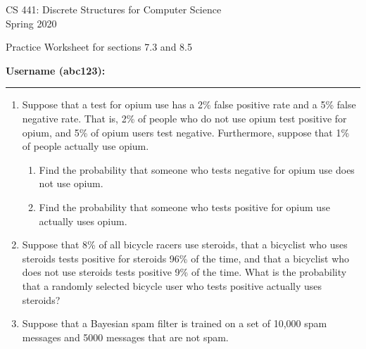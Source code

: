 \documentclass[12pt]{article}
\begin{document}
\begin{center}
CS 441: Discrete Structures for Computer Science \\
{\smaller[1] Spring 2020} \\

\vspace {0.25in}

Practice Worksheet for sections 7.3 and 8.5
\end{center}

\vspace{0.25in}

{\smaller[1]
\textbf{Username (abc123):} \rule{1.25in}{0.4pt}
}

\begin{enumerate} %


\item Suppose that a test for opium use has a 2\% false positive rate and a 5\%
false negative rate. That is, 2\% of people who do not use opium test positive
for opium, and 5\% of opium users test negative. Furthermore, suppose that 1\%
of people actually use opium.
%
\begin{enumerate}[itemsep=\fill,after=\vfill]

\item Find the probability that someone who tests negative for opium use does
not use opium.

\item Find the probability that someone who tests positive for opium use actually uses opium.

\end{enumerate}

\newpage



\item Suppose that 8\% of all bicycle racers use steroids, that a bicyclist who
uses steroids tests positive for steroids 96\% of the time, and that a bicyclist
who does not use steroids tests positive 9\% of the time. What is the
probability that a randomly selected bicycle user who tests positive actually
uses steroids?

\vfill



\item Suppose that a Bayesian spam filter is trained on a set of 10,000 spam messages and 5000 messages that are not spam.
%
\begin{itemize}


\end{itemize}
\end{enumerate}
\end{document}
